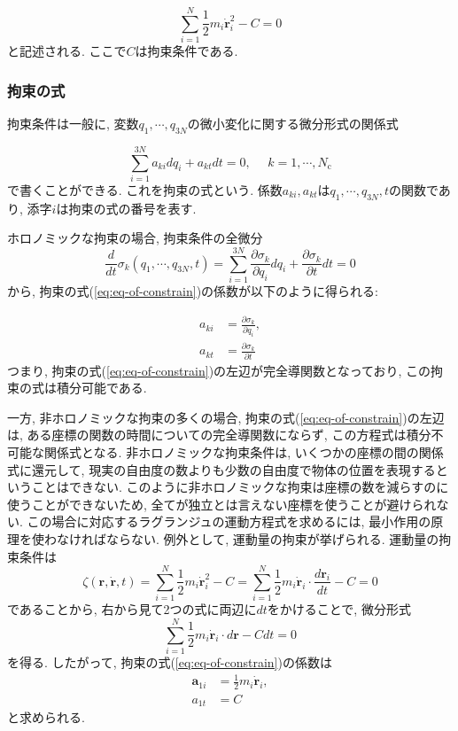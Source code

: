 \begin{equation}
  \sum_{i = 1}^{N} \frac{1}{2} m_{i} \dot{\bm{r}}_{i}^{2} - C = 0
\end{equation}
と記述される. ここで$C$は拘束条件である. 

\subsubsection{拘束の式}
拘束条件は一般に, 変数$q_{1}, \cdots, q_{3N}$の微小変化に関する微分形式の関係式

\begin{equation}
  \sum_{i = 1}^{3N} a_{ki} dq_{i} + a_{kt} dt = 0,~~~~~~ k = 1,\cdots, N_{\mathrm{c}}
  \label{eq:eq-of-constrain}
\end{equation}
で書くことができる. これを拘束の式という. 係数$a_{ki}, a_{kt}$は$q_{1}, \cdots, q_{3N}, t$の関数であり, 添字$i$は拘束の式の番号を表す. 

ホロノミックな拘束の場合, 拘束条件の全微分
\begin{equation}
  \frac{d}{d t} \sigma_{k} (q_1, \cdots, q_{3N}, t)
  =
  \sum_{i = 1}^{3N} \frac{\partial \sigma_{k}}{\partial q_{i}} d q_{i}
  + \frac{\partial \sigma_{k}}{\partial t} dt
  = 0
\end{equation}
から, 拘束の式(\ref{eq:eq-of-constrain})の係数が以下のように得られる:

\begin{align}
  a_{ki} &= \frac{\partial \sigma_{k}}{\partial q_{i}}, \\
  a_{kt} &= \frac{\partial \sigma_{k}}{\partial t}
\end{align}
つまり, 拘束の式(\ref{eq:eq-of-constrain})の左辺が完全導関数となっており, この拘束の式は積分可能である. 

一方, 非ホロノミックな拘束の多くの場合, 拘束の式(\ref{eq:eq-of-constrain})の左辺は, ある座標の関数の時間についての完全導関数にならず, この方程式は積分不可能な関係式となる. 非ホロノミックな拘束条件は, いくつかの座標の間の関係式に還元して, 現実の自由度の数よりも少数の自由度で物体の位置を表現するということはできない. このように非ホロノミックな拘束は座標の数を減らすのに使うことができないため, 全てが独立とは言えない座標を使うことが避けられない. この場合に対応するラグランジュの運動方程式を求めるには, 最小作用の原理を使わなければならない. 例外として, 運動量の拘束が挙げられる. 運動量の拘束条件は
\begin{equation}
  \zeta(\bm{r}, \dot{\bm{r}}, t)
  = \sum_{i = 1}^{N} \frac{1}{2} m_{i} \dot{\bm{r}}_{i}^{2} - C
  = \sum_{i = 1}^{N} \frac{1}{2} m_{i} \dot{\bm{r}}_{i} \cdot \frac{d \bm{r}_{i}}{dt} - C
  = 0
\end{equation}
であることから, 右から見て2つの式に両辺に$dt$をかけることで, 微分形式
\begin{equation}
  \sum_{i = 1}^{N} \frac{1}{2} m_{i} \dot{\bm{r}}_{i} \cdot d \bm{r} - C dt = 0
\end{equation}
を得る. したがって, 拘束の式(\ref{eq:eq-of-constrain})の係数は
\begin{align}
  \bm{a}_{1i} &= \frac{1}{2} m_{i} \dot{\bm{r}}_{i}, \\
  a_{1t} &= C
\end{align}
と求められる. 

